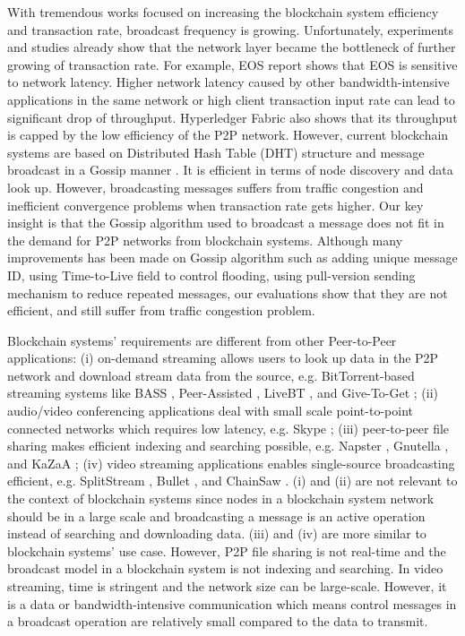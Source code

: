 With tremendous works focused on increasing the blockchain system efficiency and transaction rate, broadcast frequency is growing. Unfortunately, experiments and studies \cite{cachin2016architecture, xueos} already show that the network layer became the bottleneck of further growing of transaction rate. For example, EOS report \cite{xueos} shows that EOS is sensitive to network latency. Higher network latency caused by other bandwidth-intensive applications in the same network or high client transaction input rate can lead to significant drop of throughput. Hyperledger Fabric \cite{cachin2016architecture} also shows that its throughput is capped by the low efficiency of the P2P network. However, current blockchain systems are based on Distributed Hash Table (DHT) structure and message broadcast in a Gossip manner \cite{eugster2004epidemic}. It is efficient in terms of node discovery and data look up. However, broadcasting messages suffers from traffic congestion and inefficient convergence problems when transaction rate gets higher. Our key insight is that the Gossip algorithm used to broadcast a message does not fit in the demand for P2P networks from blockchain systems. Although many improvements has been made on Gossip algorithm such as adding unique message ID, using Time-to-Live field to control flooding, using pull-version sending mechanism to reduce repeated messages, our evaluations show that they are not efficient, and still suffer from traffic congestion problem. 

Blockchain systems' requirements are different from other Peer-to-Peer applications: (i) on-demand streaming allows users to look up data in the P2P network and download stream data from the source, e.g. BitTorrent-based streaming systems like BASS \cite{dana2005bass}, Peer-Assisted \cite{carlsson2007peer}, LiveBT \cite{lv2007livebt}, and Give-To-Get \cite{mol2008give}; (ii) audio/video conferencing applications deal with small scale point-to-point connected networks which requires low latency, e.g. Skype \cite{baset2004analysis}; (iii) peer-to-peer file sharing makes efficient indexing and searching possible, e.g. Napster \cite{saroiu2003measuring}, Gnutella \cite{ripeanu2001peer}, and KaZaA \cite{good2003usability}; (iv) video streaming applications enables single-source broadcasting efficient, e.g. SplitStream \cite{castro2003splitstream}, Bullet \cite{kostic2003bullet}, and ChainSaw \cite{pai2005chainsaw}. (i) and (ii) are not relevant to the context of blockchain systems since nodes in a blockchain system network should be in a large scale and broadcasting a message is an active operation instead of searching and downloading data. (iii) and (iv) are more similar to blockchain systems' use case. However, P2P file sharing is not real-time and the broadcast model in a blockchain system is not indexing and searching. In video streaming, time is stringent and the network size can be large-scale. However, it is a data or bandwidth-intensive communication which means control messages in a broadcast operation are relatively small compared to the data to transmit.

